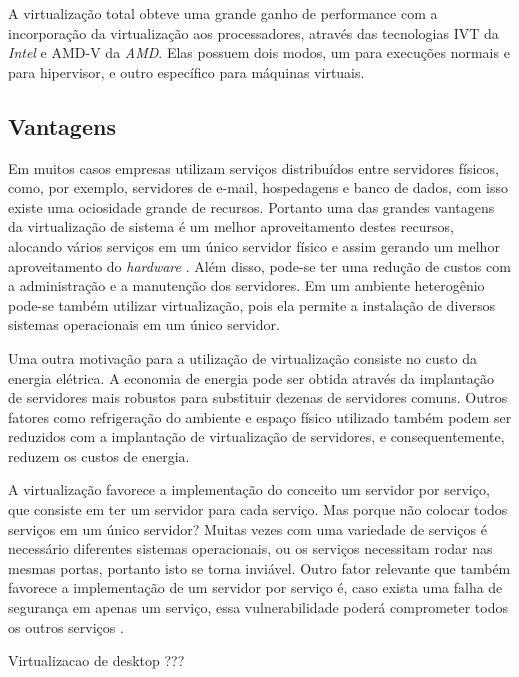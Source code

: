A virtualização total obteve uma grande ganho de performance com a incorporação da virtualização aos processadores, através das 
tecnologias \ac{IVT} da \textit{Intel} e \ac{AMD-V} da \textit{AMD}. Elas possuem dois modos, um para execuções normais e para hipervisor, 
e outro específico para máquinas virtuais. 

\subsection{Vantagens}
\label{section:virtvantag}

Em muitos casos empresas utilizam serviços distribuídos entre servidores físicos, como, por exemplo, servidores de e-mail, hospedagens e 
banco de dados, com isso existe uma ociosidade grande de recursos. Portanto uma das grandes vantagens da virtualização de sistema é um melhor 
aproveitamento destes recursos, alocando vários serviços em um único servidor físico e assim gerando um melhor aproveitamento do \textit{hardware} 
\cite{moreira2006}. Além disso, pode-se ter uma redução de custos com a administração e a manutenção dos servidores. Em um ambiente 
heterogênio pode-se também utilizar virtualização, pois ela permite a instalação de diversos sistemas operacionais em um único servidor.

Uma outra motivação para a utilização de virtualização consiste no custo da energia elétrica. A economia de energia pode ser obtida através 
da implantação de servidores mais robustos para substituir dezenas de servidores comuns. Outros fatores como refrigeração do ambiente e 
espaço físico utilizado também podem ser reduzidos com a implantação de virtualização de servidores, e consequentemente, reduzem os 
custos de energia.

A virtualização favorece a implementação do conceito um servidor por serviço, que consiste em ter um servidor para cada serviço.
Mas porque não colocar todos serviços em um único servidor? Muitas vezes com uma variedade de serviços é necessário diferentes 
sistemas operacionais, ou os serviços necessitam rodar nas mesmas portas, portanto isto se torna inviável. Outro fator relevante que 
também favorece a implementação de um servidor por serviço é, caso exista uma falha de segurança em apenas um serviço, essa 
vulnerabilidade poderá comprometer todos os outros serviços \cite{carissimi2008}.

Virtualizacao de desktop ???



